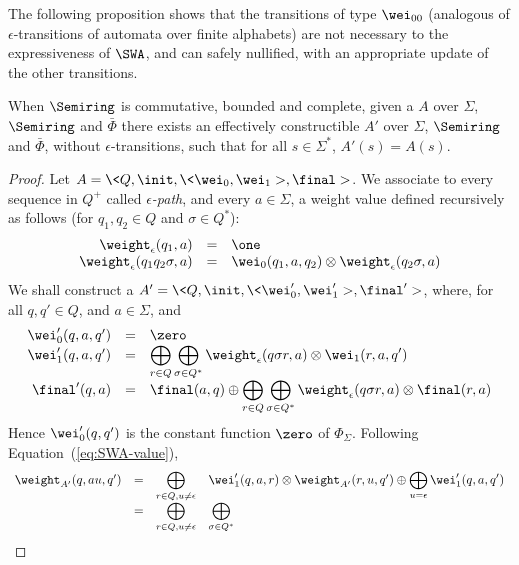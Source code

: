 \medskip
The following proposition shows that the transitions of type $\wei_{00}$
(analogous of $\epsilon$-transitions of automata over finite alphabets)
are not necessary to the expressiveness of $\SWA$, 
and can safely nullified, 
with an appropriate update of the other transitions.
%
\begin{proposition}
When $\Semiring$ is commutative, bounded and complete, 
given a \SWA $A$ 
over $\Sigma$, $\Semiring$ and $\bar\Phi$
there exists an effectively constructible \SWA $A'$ 
over $\Sigma$, $\Semiring$ and $\bar\Phi$,
without $\epsilon$-transitions,
such that for all $s \in \Sigma^*$, $A'(s) = A(s)$.
\end{proposition}
%
\begin{proof} 
Let $A = \< Q, \init, \<\wei_0, \wei_1>, \final >$.
%
We associate to every sequence in $Q^+$ called \emph{$\epsilon$-path}, 
and every $a \in \Sigma$, a weight value 
defined recursively as follows (for $q_1, q_2 \in Q$ and $\sigma \in Q^*$):
\[
\begin{array}{rcl}
\weight_\epsilon(q_1, a) & = & \one\\
\weight_\epsilon(q_1 q_2 \sigma, a) & = & \wei_0(q_1, a, q_2) \otimes \weight_\epsilon(q_2 \sigma, a)\\
\end{array}
\]
%
We shall construct a \SWA $A' = \< Q, \init, \<\wei'_0, \wei'_1>, \final' >$,
where, for all $q, q' \in Q$, and $a \in \Sigma$, 
and 
\[
\begin{array}{rcl}
\wei'_0(q, a, q') & = & \zero\\
\wei'_1(q, a, q') & = & 
\displaystyle\bigoplus_{r \in Q} 
\displaystyle\bigoplus_{\sigma \in Q^*} 
\weight_\epsilon(q\sigma r, a) \otimes  \wei_1(r, a, q')\\
\final'(q, a) & = & 
\final(a, q) \oplus
\displaystyle\bigoplus_{r \in Q} 
\displaystyle\bigoplus_{\sigma \in Q^*} 
\weight_\epsilon(q\sigma r, a) \otimes \final(r, a)\\
\end{array}
\]
Hence $\wei'_0(q, q')$ is the constant function $\zero$ of $\Phi_\Sigma$.
Following Equation~(\ref{eq:SWA-value}),
\[
\begin{array}{lccl}
\weight_{A'}(q, au, q') & = & 
    \displaystyle\bigoplus_{r \in Q, u \neq \epsilon} &
    \wei'_{1}(q, a, r) \otimes \weight_{A'}(r, u, q')
    \oplus \displaystyle\bigoplus_{u = \epsilon} \wei'_{1}(q, a, q') \\
 & = & \displaystyle\bigoplus_{r \in Q, u \neq \epsilon} & 
  \displaystyle\bigoplus_{\sigma \in Q^*} 

\end{array}\]
\end{proof}
